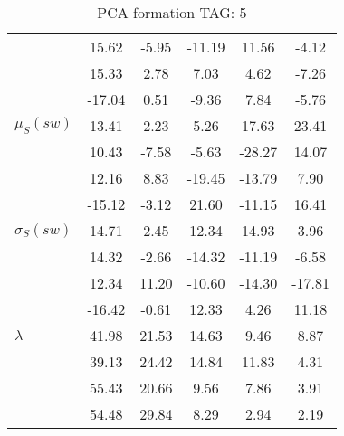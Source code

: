 \begin{table}[h!]
\begin{center}
\begin{tabular}{| l || c | c | c | c | c |}
 & 15.62  & -5.95  & -11.19  & 11.56  & -4.12 \\
 & 15.33  & 2.78  & 7.03  & 4.62  & -7.26 \\
 & -17.04  & 0.51  & -9.36  & 7.84  & -5.76 \\\hline
$\mu_S(sw)$ & 13.41  & 2.23  & 5.26  & 17.63  & 23.41 \\
 & 10.43  & -7.58  & -5.63  & -28.27  & 14.07 \\
 & 12.16  & 8.83  & -19.45  & -13.79  & 7.90 \\
 & -15.12  & -3.12  & 21.60  & -11.15  & 16.41 \\\hline
$\sigma_S(sw)$ & 14.71  & 2.45  & 12.34  & 14.93  & 3.96 \\
 & 14.32  & -2.66  & -14.32  & -11.19  & -6.58 \\
 & 12.34  & 11.20  & -10.60  & -14.30  & -17.81 \\
 & -16.42  & -0.61  & 12.33  & 4.26  & 11.18 \\\hline\hline
$\lambda$ & 41.98  & 21.53  & 14.63  & 9.46  & 8.87 \\
 & 39.13  & 24.42  & 14.84  & 11.83  & 4.31 \\
 & 55.43  & 20.66  & 9.56  & 7.86  & 3.91 \\
 & 54.48  & 29.84  & 8.29  & 2.94  & 2.19 \\\hline
\end{tabular}
\caption{PCA formation TAG: 5}
\end{center}
\end{table}